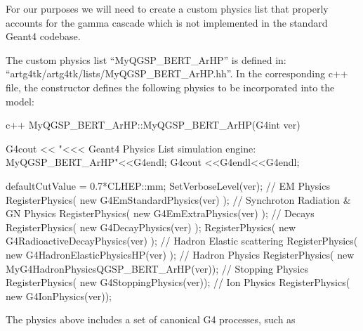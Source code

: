\documentclass[8pt]{refart}
\begin{document}
For our purposes we will need to create a custom physics list that properly accounts for the gamma cascade which is not implemented in the standard Geant4 codebase.

The custom physics list ``MyQGSP\_BERT\_ArHP'' is defined in:\\
``artg4tk/artg4tk/lists/MyQGSP\_BERT\_ArHP.hh''.  In the corresponding c++ file, the constructor defines the following physics to be incorporated into the model:
\begin{code}{c++}
MyQGSP_BERT_ArHP::MyQGSP_BERT_ArHP(G4int ver)
{
  G4cout << "<<< Geant4 Physics List simulation engine: MyQGSP_BERT_ArHP"<<G4endl;
  G4cout <<G4endl<<G4endl;

  defaultCutValue = 0.7*CLHEP::mm;
  SetVerboseLevel(ver);
  // EM Physics
  RegisterPhysics( new G4EmStandardPhysics(ver) );
  // Synchroton Radiation & GN Physics
  RegisterPhysics( new G4EmExtraPhysics(ver) );
  // Decays
  RegisterPhysics( new G4DecayPhysics(ver) );
  RegisterPhysics( new G4RadioactiveDecayPhysics(ver) );
  // Hadron Elastic scattering
  RegisterPhysics( new G4HadronElasticPhysicsHP(ver) );
  // Hadron Physics
  RegisterPhysics( new MyG4HadronPhysicsQGSP_BERT_ArHP(ver));
  // Stopping Physics
  RegisterPhysics( new G4StoppingPhysics(ver));
  // Ion Physics
  RegisterPhysics( new G4IonPhysics(ver));
}
\end{code}
The physics above includes a set of canonical G4 processes, such as 
\end{document}
